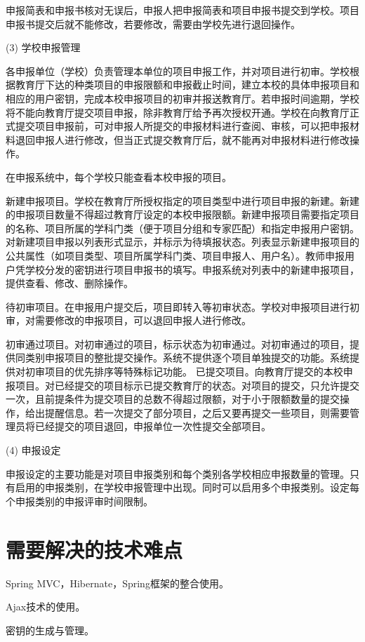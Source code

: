 申报简表和申报书核对无误后，申报人把申报简表和项目申报书提交到学校。项目申报书提交后就不能修改，若要修改，需要由学校先进行退回操作。

(3)	学校申报管理\par
各申报单位（学校）负责管理本单位的项目申报工作，并对项目进行初审。学校根据教育厅下达的种类项目的申报限额和申报截止时间，建立本校的具体申报项目和相应的用户密钥，完成本校申报项目的初审并报送教育厅。若申报时间逾期，学校将不能向教育厅提交项目申报，除非教育厅给予再次授权开通。学校在向教育厅正式提交项目申报前，可对申报人所提交的申报材料进行查阅、审核，可以把申报材料退回申报人进行修改，但当正式提交教育厅后，就不能再对申报材料进行修改操作。

在申报系统中，每个学校只能查看本校申报的项目。

新建申报项目。学校在教育厅所授权指定的项目类型中进行项目申报的新建。新建的申报项目数量不得超过教育厅设定的本校申报限额。新建申报项目需要指定项目的名称、项目所属的学科门类（便于项目分组和专家匹配）和指定申报用户密钥。对新建项目申报以列表形式显示，并标示为待填报状态。列表显示新建申报项目的公共属性（如项目类型、项目所属学科门类、项目申报人、用户名）。教师申报用户凭学校分发的密钥进行项目申报书的填写。申报系统对列表中的新建申报项目，提供查看、修改、删除操作。

待初审项目。在申报用户提交后，项目即转入等初审状态。学校对申报项目进行初审，对需要修改的申报项目，可以退回申报人进行修改。

初审通过项目。对初审通过的项目，标示状态为初审通过。对初审通过的项目，提供同类别申报项目的整批提交操作。系统不提供逐个项目单独提交的功能。系统提供对初审项目的优先排序等特殊标记功能。
已提交项目。向教育厅提交的本校申报项目。对已经提交的项目标示已提交教育厅的状态。对项目的提交，只允许提交一次，且前提条件为提交项目的总数不得超过限额，对于小于限额数量的提交操作，给出提醒信息。若一次提交了部分项目，之后又要再提交一些项目，则需要管理员将已经提交的项目退回，申报单位一次性提交全部项目。

(4)	申报设定\par
申报设定的主要功能是对项目申报类别和每个类别各学校相应申报数量的管理。只有启用的申报类别，在学校申报管理中出现。同时可以启用多个申报类别。设定每个申报类别的申报评审时间限制。

\section{需要解决的技术难点}
Spring MVC，Hibernate，Spring框架的整合使用。\par
Ajax技术的使用。\par
密钥的生成与管理。\par
